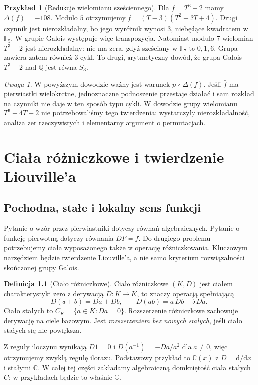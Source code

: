 \documentclass[11pt,a4paper,oneside]{book}
\numberwithin{equation}{section}
\theoremstyle{plain}
\theoremstyle{definition}
\newtheorem{definicja}[twierdzenie]{Definicja}
\newtheorem{przyklad}[twierdzenie]{Przykład}
\theoremstyle{remark}
\newtheorem{uwaga}[twierdzenie]{Uwaga}
\newcommand{\Q}{\mathbb{Q}}
\newcommand{\C}{\mathbb{C}}
\newcommand{\F}{\mathbb{F}}
\begin{document}
\begin{przyklad}[Redukcje wielomianu sześciennego]
Dla $f=T^3-2$ mamy $\Delta(f)=-108$. Modulo $5$ otrzymujemy
$\bar f=(T-3)(T^2+3T+4)$. Drugi czynnik jest nierozkładalny, bo jego wyróżnik wynosi $3$, niebędące kwadratem w $\F_5$. W grupie Galois występuje więc transpozycja. Natomiast modulo $7$ wielomian $T^3-2$ jest nierozkładalny: nie ma zera, gdyż sześciany w $\F_7$ to $0,1,6$. Grupa zawiera zatem również $3$-cykl. To drugi, arytmetyczny dowód, że grupa Galois $T^3-2$ nad $\Q$ jest równa $S_3$.
\end{przyklad}

\begin{uwaga}
W powyższym dowodzie ważny jest warunek $p\nmid\Delta(f)$. Jeśli $\bar f$ ma pierwiastki wielokrotne, jednoznaczne podnoszenie przestaje działać i sam rozkład na czynniki nie daje w ten sposób typu cykli. W dowodzie grupy wielomianu $T^5-4T+2$ nie potrzebowaliśmy tego twierdzenia: wystarczyły nierozkładalność, analiza zer rzeczywistych i elementarny argument o permutacjach.
\end{uwaga}


\chapter{Ciała różniczkowe i twierdzenie Liouville'a}

\section{Pochodna, stałe i lokalny sens funkcji}

Pytanie o wzór przez pierwiastniki dotyczy równań algebraicznych. Pytanie o funkcję pierwotną dotyczy równania $DF=f$. Do drugiego problemu potrzebujemy ciała wyposażonego także w operację różniczkowania. Kluczowym narzędziem będzie twierdzenie Liouville'a, a nie samo kryterium rozwiązalności skończonej grupy Galois.

\begin{definicja}[Ciało różniczkowe]
Ciało różniczkowe $(K,D)$ jest ciałem charakterystyki zero z derywacją $D:K\to K$, to znaczy operacją spełniającą
\[
D(a+b)=Da+Db,\qquad D(ab)=a\,Db+b\,Da.
\]
Ciało stałych to $C_K=\{a\in K:Da=0\}$. Rozszerzenie różniczkowe zachowuje derywację na ciele bazowym. Jest \emph{rozszerzeniem bez nowych stałych}, jeśli ciało stałych się nie powiększa.
\end{definicja}

Z reguły iloczynu wynikają $D1=0$ i $D(a^{-1})=-Da/a^2$ dla $a\ne0$, więc otrzymujemy zwykłą regułę ilorazu. Podstawowy przykład to $\C(x)$ z $D=\mathrm{d}/\mathrm{d}x$ i stałymi $\C$. W całej tej części zakładamy algebraiczną domkniętość ciała stałych $C$; w przykładach będzie to właśnie $\C$.
\end{document}
